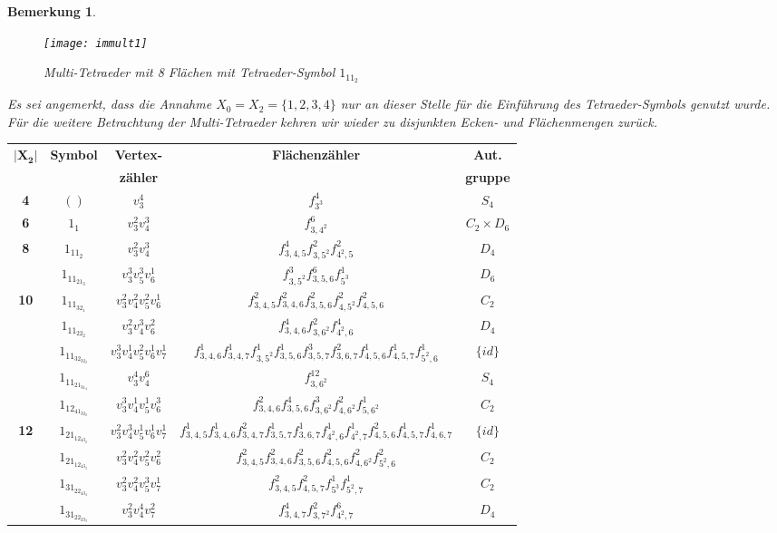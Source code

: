 \documentclass[12pt,titlepage,twoside,cleardoublepage]{article}
\theoremstyle{nummermitklammern}
\newtheorem{bemerkung}[temp]{Bemerkung}
\newtheorem{bemerkung}[zahl]{Bemerkung}
\numberwithin{equation}{section}
\begin{document}
\begin{bemerkung}
\begin{itemize}
\begin{figure}[H]
\begin{center}
\texttt{[image: immult1]}
\end{center}
\caption{Multi-Tetraeder mit 8 Flächen mit Tetraeder-Symbol $1_11_2$}
\end{figure}
\end{itemize}   
Es sei angemerkt, dass die Annahme $X_0=X_2=\{1,2,3,4\}$ nur an dieser Stelle für die Einführung des Tetraeder-Symbols genutzt wurde. Für die weitere Betrachtung der Multi-Tetraeder kehren wir wieder zu disjunkten Ecken- und Flächenmengen zurück. 
\end{bemerkung}
\begin{center}
{\footnotesize
\begin{tabular}[h]{|c|c|c|c|c|}
\hline
$\vert\textbf{X}_{\textbf{2}}\vert$ & \textbf{Symbol} & \textbf{Vertex-}& \textbf{Flächenzähler} & \textbf{Aut.} \\
 &&\textbf{zähler}&& \textbf{gruppe}\\
\hline
\textbf{4} & $()$ &$v_3^4$ & $f_{3^3}^4$ &$S_4$\\
\hline
\textbf{6} & $1_1$ & $v_3^2v_4^3$&$f^6_{3,4^2}$ &$C_2\times D_6$\\
\hline
\textbf{8} & $1_11_2$&$ v_3^2v_4^3$& $f^4_{3,4,5}f^2_{3,5^2}f^2_{4^2,5}$ & $D_4$\\
\hline  
  & $1_11_21_3$ & $v_3^3v_5^3v_6^1$& $f^3_{3,5^2}f^6_{3,5,6}f^1_{5^3}$ &$D_6$\\
\textbf{10}& $1_11_32_1$ &$v_3^2v_4^2v_5^2v_6^1$ & $f^2_{3,4,5}f^2_{3,4,6}f^2_{3,5,6}f^2_{4,5^2}f^2_{4,5,6}$ & $C_2$\\
  & $1_11_22_2$ &$v_3^2v_4^3v_6^2$& $f^4_{3,4,6}f^2_{3,6^2}f^4_{4^2,6}$ &$D_4$\\
\hline
  & $1_11_32_32_2$&$v_3^3v_4^1v_5^2v_6^1v_7^1$& $f^1_{3,4,6}f^1_{3,4,7}f^1_{3,5^2}f^1_{3,5,6}f^3_{3,5,7}f^2_{3,6,7}f^1_{4,5,6}f^1_{4,5,7}f^1_{5^2,6}$ &$\{id\}$\\
  & $1_11_21_31_4$& $v_3^4v_4^6$& $f^{12}_{3,6^2}$ &$S_4$\\
  & $1_12_41_32_2$&$v_3^3v_4^1v_5^1v_6^3$& $f^2_{3,4,6}f^4_{3,5,6}f^3_{3,6^2}f^2_{4,6^2}f^1_{5,6^2}$ & $C_2$\\
\textbf{12}& $1_21_12_43_2$&$v_3^2v_4^3v_5^1v_6^1v_7^1$& $f^1_{3,4,5}f^1_{3,4,6}f^2_{3,4,7}f^1_{3,5,7}f^1_{3,6,7}f^1_{4^2,6}f^1_{4^2,7}f^2_{4,5,6}f^1_{4,5,7}f^1_{4,6,7}$ &$\{id\}$\\
  & $1_21_12_43_3$& $v_3^2v_4^2v_5^2v_6^2$& $f^2_{3,4,5}f^2_{3,4,6}f^2_{3,5,6}f^2_{4,5,6}f^2_{4,6^2}f^2_{5^2,6}$&$C_2$\\
  & $1_31_22_43_4$& $v_3^2v_4^2v_5^3v_7^1$& $f^2_{3,4,5}f^2_{4,5,7}f^1_{5^3}f^1_{5^2,7}$&$C_2$\\
  & $1_31_22_23_3$& $v_3^2v_4^4v_7^2$&$f^4_{3,4,7}f^2_{3,7^2}f^6_{4^2,7}$ &$D_4$\\
 \hline
\end{tabular}
}
\end{center}
\end{document}
